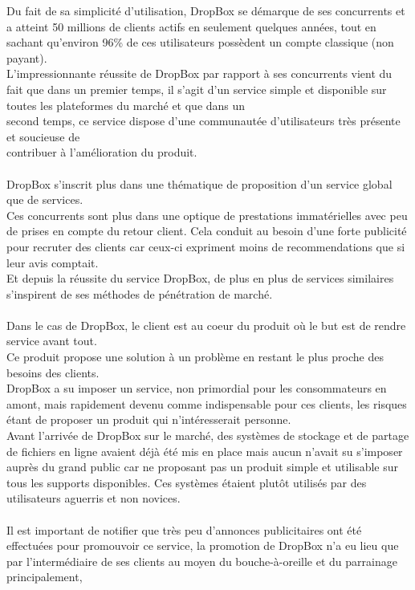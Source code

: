 \documentclass[a4paper, 10pt]{article}
\begin{document}
Du fait de sa simplicité d'utilisation, DropBox se démarque de ses concurrents et
a atteint 50 millions de clients actifs en seulement quelques années,
tout en sachant qu'environ 96\% de ces utilisateurs possèdent un compte classique (non payant).\\
L'impressionnante réussite de DropBox par rapport à ses concurrents vient du fait que dans un premier temps,
il s'agit d'un service simple et disponible sur toutes les plateformes du marché et
que dans un\\second temps, ce service dispose d'une communautée d'utilisateurs très présente et soucieuse
de\\contribuer à l'amélioration du produit.\\ \\
DropBox s'inscrit plus dans une thématique de proposition d'un service global que de services.\\
Ces concurrents sont plus dans une optique de prestations immatérielles avec peu de prises en compte du retour client.
Cela conduit au besoin d'une forte publicité pour recruter des clients
car ceux-ci expriment moins de recommendations que si leur avis comptait.\\
Et depuis la réussite du service DropBox, de plus en plus de services similaires s'inspirent de ses méthodes de pénétration de marché.\\ \\
Dans le cas de DropBox, le client est au coeur du produit où le but est de rendre service avant tout.\\
Ce produit propose une solution à un problème en restant le plus proche des besoins des clients.\\
DropBox a su imposer un service, non primordial pour les consommateurs en amont,
mais rapidement devenu comme indispensable pour ces clients, les risques étant de proposer un produit qui n'intéresserait personne.\\
Avant l'arrivée de DropBox sur le marché, des systèmes de stockage et de partage de fichiers en ligne avaient déjà été mis en place
mais aucun n'avait su s'imposer auprès du grand public car ne proposant pas un produit simple et utilisable sur tous les supports disponibles.
Ces systèmes étaient plutôt utilisés par des utilisateurs aguerris et non novices.\\ \\
Il est important de notifier que très peu d'annonces publicitaires ont été effectuées pour promouvoir ce service,
la promotion de DropBox n'a eu lieu que par l'intermédiaire de ses clients au moyen du bouche-à-oreille et du parrainage principalement,
\end{document}
